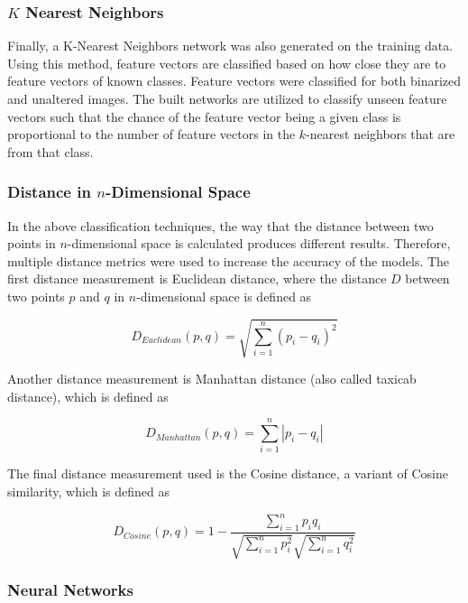 \subsubsection{$K$ Nearest Neighbors}

Finally, a K-Nearest Neighbors network was also generated on the training data. Using this method, feature vectors are classified based on how close they are to feature vectors of known classes. Feature vectors were classified for both binarized and unaltered images. The built networks are utilized to classify unseen feature vectors such that the chance of the feature vector being a given class is proportional to the number of feature vectors in the $k$-nearest neighbors that are from that class.

\subsubsection{Distance in $n$-Dimensional Space}
In the above classification techniques, the way that the distance between two points in $n$-dimensional space is calculated produces different results. Therefore, multiple distance metrics were used to increase the accuracy of the models. The first distance measurement is Euclidean distance, where the distance $D$ between two points $p$ and $q$ in $n$-dimensional space is defined as

\begin{equation}
  \label{eq:distanceEuclidian}
  D_{Euclidean}(p,q) = \sqrt{\sum_{i=1}^{n} (p_i - q_i)^2}
\end{equation}

Another distance measurement is Manhattan distance (also called taxicab distance), which is defined as

\begin{equation}
  \label{eq:distanceManhattan}
  D_{Manhattan}(p,q) = \sum_{i=1}^{n} |p_i - q_i|
\end{equation}

The final distance measurement used is the Cosine distance, a variant of Cosine similarity, which is defined as

\begin{equation}
  \label{eq:distanceCosine}
  D_{Cosine}(p,q) = 1 - \frac{\sum_{i=1}^{n}p_i q_i}{\sqrt{\sum_{i=1}^{n} p_i^2}\sqrt{\sum_{i=1}^{n} q_i^2}}
\end{equation}

\subsubsection{Neural Networks}

